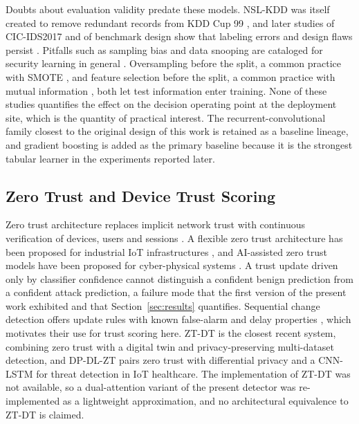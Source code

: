 \documentclass[journal]{IEEEtran}
\begin{document}
Doubts about evaluation validity predate these models. NSL-KDD was itself created to remove redundant records from KDD Cup 99 \cite{tavallaee2009detailed}, and later studies of CIC-IDS2017 and of benchmark design show that labeling errors and design flaws persist \cite{engelen2021troubleshooting,flood2024bad}. Pitfalls such as sampling bias and data snooping are cataloged for security learning in general \cite{arp2022dos}. Oversampling before the split, a common practice with SMOTE \cite{chawla2002smote}, and feature selection before the split, a common practice with mutual information \cite{vergara2014review}, both let test information enter training. None of these studies quantifies the effect on the decision operating point at the deployment site, which is the quantity of practical interest. The recurrent-convolutional family closest to the original design of this work is retained as a baseline lineage, and gradient boosting \cite{ke2017lightgbm} is added as the primary baseline because it is the strongest tabular learner in the experiments reported later.

\subsection{Zero Trust and Device Trust Scoring}
Zero trust architecture replaces implicit network trust with continuous verification of devices, users and sessions \cite{rose2020zero}. A flexible zero trust architecture has been proposed for industrial IoT infrastructures \cite{zanasi2024flexible}, and AI-assisted zero trust models have been proposed for cyber-physical systems \cite{rehman2025immersive}. A trust update driven only by classifier confidence cannot distinguish a confident benign prediction from a confident attack prediction, a failure mode that the first version of the present work exhibited and that Section~\ref{sec:results} quantifies. Sequential change detection offers update rules with known false-alarm and delay properties \cite{page1954continuous}, which motivates their use for trust scoring here. ZT-DT \cite{mishra2026zero} is the closest recent system, combining zero trust with a digital twin and privacy-preserving multi-dataset detection, and DP-DL-ZT \cite{hezam2026dp} pairs zero trust with differential privacy and a CNN-LSTM for threat detection in IoT healthcare. The implementation of ZT-DT was not available, so a dual-attention variant of the present detector was re-implemented as a lightweight approximation, and no architectural equivalence to ZT-DT is claimed.
\end{document}
